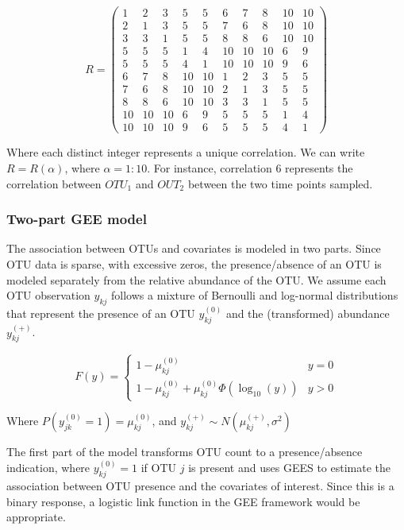 \documentclass[12pt]{article}
\begin{document}
\begin{singlespace}
$$R = \begin{pmatrix}
        1 & 2 & 3 & 5 & 5 &  6 & 7 & 8 & 10 & 10 \\
        2 & 1 & 3 & 5 & 5 & 7 & 6 & 8 & 10 & 10 \\
        3 & 3 & 1 & 5 & 5 & 8 & 8 & 6 & 10 & 10 \\
        5 & 5 & 5 & 1 & 4 & 10 & 10 & 10 & 6 & 9 \\
        5 & 5 & 5 & 4 & 1 & 10 & 10 & 10  & 9 & 6 \\
        6 & 7 & 8 & 10 & 10 & 1 & 2 & 3 & 5 & 5  \\
        7 & 6 & 8 & 10 & 10 & 2 & 1 & 3 & 5 & 5  \\
        8 & 8 & 6 & 10 & 10 & 3 & 3 & 1 & 5 & 5 \\
        10 & 10 & 10 & 6 & 9 & 5 & 5 & 5 & 1 & 4  \\
        10 & 10 & 10  & 9 & 6  & 5 & 5 & 5 & 4 & 1
  \end{pmatrix}$$
\end{singlespace}
Where each distinct integer represents a unique correlation. We can write $R = R(\alpha)$, where $\alpha = 1:10$. For instance, correlation 6 represents the correlation between $OTU_1$ and $OUT_2$ between the two time points sampled.

\subsubsection{Two-part GEE model}

The association between OTUs and covariates is modeled in two parts. Since OTU data is sparse, with excessive zeros, the presence/absence of an OTU is modeled separately from the relative abundance of the OTU. We assume each OTU observation $y_{kj}$ follows a mixture of Bernoulli and log-normal distributions that represent the presence of an OTU $y_{kj}^{(0)}$ and the (transformed) abundance $y_{kj}^{(+)}$.

$$F(y) = \begin{cases}
  1 - \mu_{kj}^{(0)} & y = 0\\
  1 - \mu_{kj}^{(0)} + \mu_{kj}^{(0)}\Phi(\log_{10}(y)) & y > 0
\end{cases}
$$

Where $P(y_{jk}^{(0)} = 1) = \mu_{kj}^{(0)}$, and $y_{kj}^{(+)} \sim N(\mu_{kj}^{(+)}, \sigma^2)$

The first part of the model transforms OTU count to a presence/absence indication, where $y_{kj}^{(0)} = 1$ if OTU $j$ is present and uses GEES to estimate the association between OTU presence and the covariates of interest. Since this is a binary response, a logistic link function in the GEE framework would be appropriate.
\end{document}
